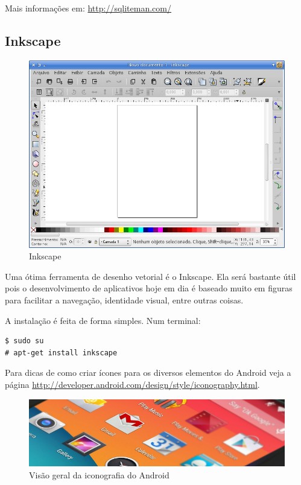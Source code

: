 Mais informações em: \url{http://sqliteman.com/}

\subsection{Inkscape}

\begin{figure}[h]
\centering
\includegraphics[scale=0.45]{img/preparando-ambiente/inkscape.png}
\caption{Inkscape}
\end{figure}

Uma ótima ferramenta de desenho vetorial é o Inkscape. Ela será bastante
útil pois o desenvolvimento de aplicativos hoje em dia é baseado muito
em figuras para facilitar a navegação, identidade visual, entre outras
coisas.

A instalação é feita de forma simples. Num terminal:

\begin{verbatim}
$ sudo su
# apt-get install inkscape
\end{verbatim}
Para dicas de como criar ícones para os diversos elementos do Android
veja a página
\url{http://developer.android.com/design/style/iconography.html}.

\begin{figure}[h]
    \includegraphics[scale=0.5]{img/preparando-ambiente/iconography-overview.png}
    \caption{Visão geral da iconografia do Android}
\end{figure}
